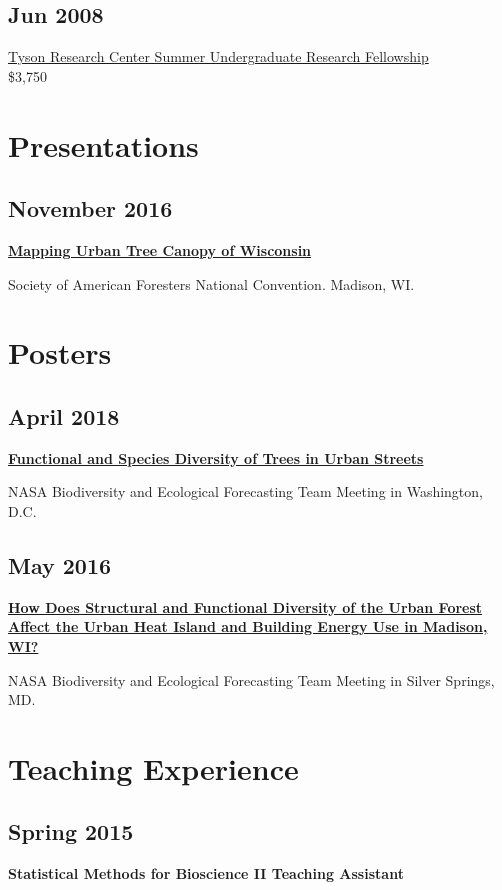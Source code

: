 \documentclass{article}
\begin{document}
\subsection*{Jun 2008}
\label{sec:org75fa43c}
\href{http://tyson.wustl.edu/teaching-ugrad.php}{Tyson Research Center Summer Undergraduate Research Fellowship} \\
 \$3,750

\section*{Presentations}
\label{sec:org7819fc6}
\subsection*{November 2016}
\label{sec:orgf650f71}
\textbf{\href{http://pages.stat.wisc.edu/\~erker/Presentations/SAF\_20161105/saf\_presentation.html}{Mapping Urban Tree Canopy of Wisconsin}}

Society of American Foresters National Convention. Madison, WI.
\section*{Posters}
\label{sec:org524ea97}
\subsection*{April 2018}
\label{sec:org60d763b}
\textbf{\href{http://pages.stat.wisc.edu/\~erker/Posters/NASA\_poster\_2018.jpg}{Functional and Species Diversity of Trees in Urban Streets}}

NASA Biodiversity and Ecological Forecasting Team Meeting in
Washington, D.C.
\subsection*{May 2016}
\label{sec:orgc9ebee4}
\textbf{\href{http://pages.stat.wisc.edu/\~erker/Posters/NASA\_poster\_2016.jp2}{How Does Structural and Functional Diversity of the Urban Forest
Affect the Urban Heat Island and Building Energy Use in Madison, WI?}}

NASA Biodiversity and Ecological Forecasting Team Meeting in Silver Springs, MD.
\section*{Teaching Experience}
\label{sec:orgaa0a835}
\subsection*{Spring 2015}
\label{sec:org2c07c80}
\textbf{Statistical Methods for Bioscience II Teaching Assistant}
\end{document}
